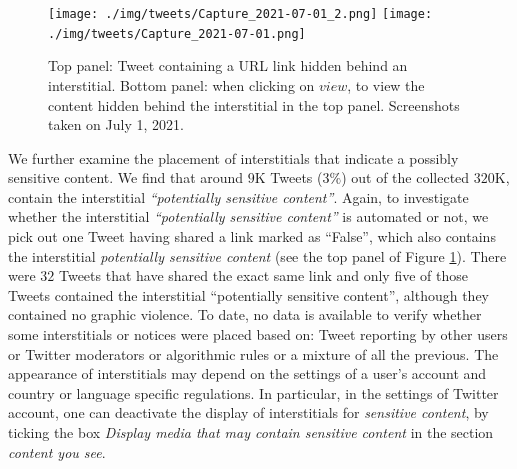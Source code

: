 \documentclass[Afour,sageh,times]{sagej}
\begin{document}
\begin{figure}[h]
	\centering
		\texttt{[image: ./img/tweets/Capture\_2021-07-01\_2.png]} 
		\texttt{[image: ./img/tweets/Capture\_2021-07-01.png]}
	\caption{Top panel: Tweet containing a URL link hidden behind an interstitial. Bottom panel: when clicking on $view$, to view the content hidden behind the interstitial in the top panel. Screenshots taken on July 1, 2021. }
	\label{fig_notice}
\end{figure}
We further examine the placement of interstitials that indicate a possibly sensitive content. We find that around $9$K Tweets ($3\%$) out of the collected $320$K, contain the interstitial {\it ``potentially sensitive content''}. 
Again, to investigate whether the interstitial {\it ``potentially sensitive content''} is automated or not, we pick out one Tweet having shared a link marked as ``False'', which also contains the interstitial {\it potentially sensitive content} (see the top panel of Figure \ref{fig_notice}). 
There were $32$ Tweets that have shared the exact same link and only five of those Tweets contained the interstitial ``potentially sensitive content'', although they contained no graphic violence. To date, no data is available to verify whether some interstitials or notices were placed based on: Tweet reporting by other users or Twitter moderators or algorithmic rules or a mixture of all the previous.   
The appearance of interstitials may depend on the settings of a user's account and country or language specific regulations. In particular, in the settings of Twitter account, one can deactivate the display of interstitials for {\it sensitive content}, by ticking the box {\it Display media that may contain sensitive content} in the section {\it content you see}. 
\end{document}
